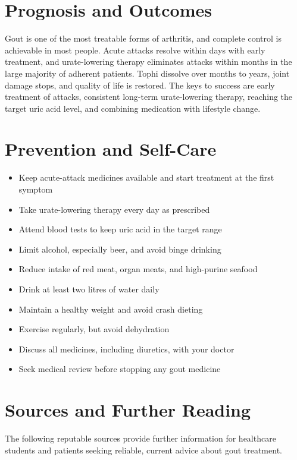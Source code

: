 \section*{Prognosis and Outcomes}
Gout is one of the most treatable forms of arthritis, and complete control is achievable in most people. Acute attacks resolve within days with early treatment, and urate-lowering therapy eliminates attacks within months in the large majority of adherent patients. Tophi dissolve over months to years, joint damage stops, and quality of life is restored. The keys to success are early treatment of attacks, consistent long-term urate-lowering therapy, reaching the target uric acid level, and combining medication with lifestyle change.

\section*{Prevention and Self-Care}
\begin{itemize}
    \item Keep acute-attack medicines available and start treatment at the first symptom
    \item Take urate-lowering therapy every day as prescribed
    \item Attend blood tests to keep uric acid in the target range
    \item Limit alcohol, especially beer, and avoid binge drinking
    \item Reduce intake of red meat, organ meats, and high-purine seafood
    \item Drink at least two litres of water daily
    \item Maintain a healthy weight and avoid crash dieting
    \item Exercise regularly, but avoid dehydration
    \item Discuss all medicines, including diuretics, with your doctor
    \item Seek medical review before stopping any gout medicine
\end{itemize}

\section*{Sources and Further Reading}
The following reputable sources provide further information for healthcare students and patients seeking reliable, current advice about gout treatment.

